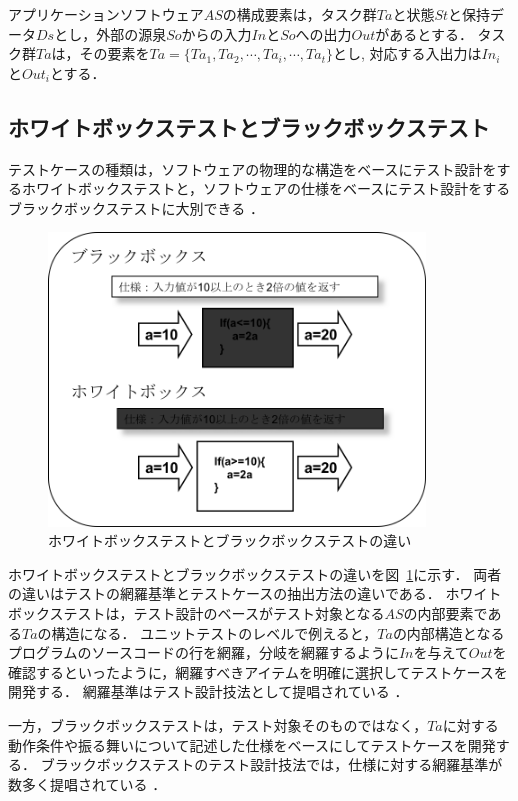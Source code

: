 アプリケーションソフトウェア$AS$の構成要素は，タスク群$Ta$と状態$St$と保持データ$Ds$とし，外部の源泉$So$からの入力$In$と$So$への出力$Out$があるとする．
タスク群$Ta$は，その要素を$Ta=\{Ta_1,Ta_2,\cdots,Ta_i,\cdots,Ta_t \}$とし, 対応する入出力は$In_i$と$Out_i$とする．
\subsection{ホワイトボックステストとブラックボックステスト}
テストケースの種類は，ソフトウェアの物理的な構造をベースにテスト設計をするホワイトボックステストと，ソフトウェアの仕様をベースにテスト設計をするブラックボックステストに大別できる\cite{myers2011art} ．

\begin{figure}[htbp]
  \begin{center}
  \includegraphics[width=10cm]{./image/D-2-BbWb.png}
  \caption{ホワイトボックステストとブラックボックステストの違い}
  \label{fig:D-2-BbWb}
  \end{center}
\end{figure}

ホワイトボックステストとブラックボックステストの違いを図~\ref{fig:D-2-BbWb}に示す．
両者の違いはテストの網羅基準とテストケースの抽出方法の違いである．
ホワイトボックステストは，テスト設計のベースがテスト対象となる$AS$の内部要素である$Ta$の構造になる．
ユニットテストのレベルで例えると，$Ta$の内部構造となるプログラムのソースコードの行を網羅，分岐を網羅するように$In$を与えて$Out$を確認するといったように，網羅すべきアイテムを明確に選択してテストケースを開発する．
網羅基準はテスト設計技法として提唱されている\cite{beiz90}
\cite{tj2005}
\cite{lewis2016software}
\cite{ammann2016introduction}
\cite{copeland2004practitioner}．

一方，ブラックボックステストは，テスト対象そのものではなく，$Ta$に対する動作条件や振る舞いについて記述した仕様をベースにしてテストケースを開発する．
ブラックボックステストのテスト設計技法では，仕様に対する網羅基準が数多く提唱されている\cite{jorgensen2016software}
\cite{beizer1995black}
\cite{binder2000testing}
\cite{kaner1999testing}
\cite{black2007pragmatic}
\cite{Ostrand:1988:CMS:62959.62964}
\cite{Grindal:2007:IPM:1332044.1332085}．

